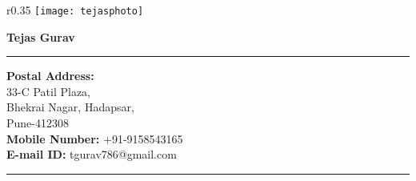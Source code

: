 \documentclass{article}
\begin{document}
	
	\begin{wrapfigure}{r}{0.35\textwidth}
		\centering
		\texttt{[image: tejasphoto]} 
	\end{wrapfigure}

	\begin{center}
		\Huge \textbf{Tejas Gurav}
	\end{center}

	\rule{450pt}{2pt}
	\begin{flushleft}
		\textbf{Postal Address:}\\
		33-C Patil Plaza,\\
		Bhekrai Nagar, Hadapsar,\\
		Pune-412308\\
		\textbf{Mobile Number:} +91-9158543165\\
		\textbf{E-mail ID:} tgurav786@gmail.com	
	\end{flushleft}	
	\rule{450pt}{2pt}
	\medskip
\end{document}
